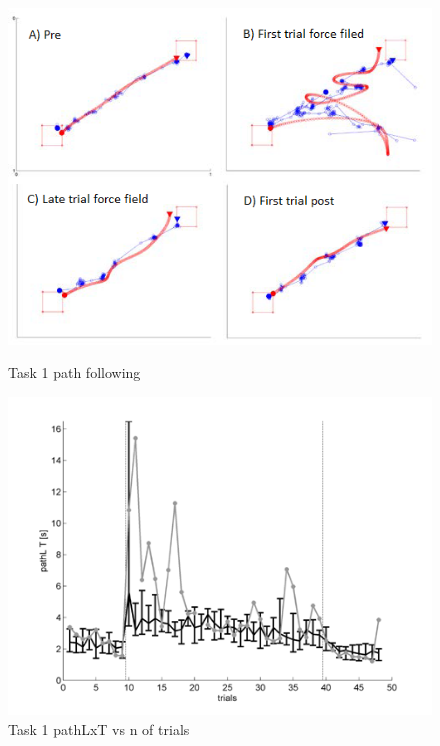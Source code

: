 \documentclass[12pt,journal,draftclsnofoot,onecolumn]{IEEEtran}
\begin{document}
\begin{figure}[h]
\centering
\begin{minipage}{0.48\textwidth}
\centering
\includegraphics[width=\textwidth]{task1.png}
\caption{Task 1 path following}
\label{fig:task1}
\end{minipage}
\begin{minipage}{0.48\textwidth}
\centering
\includegraphics[width=\textwidth]{task1_pT.png}
\caption{Task 1 pathLxT vs n of trials}
\label{fig:task1_pT}
\end{minipage}
\end{figure}
\end{document}
